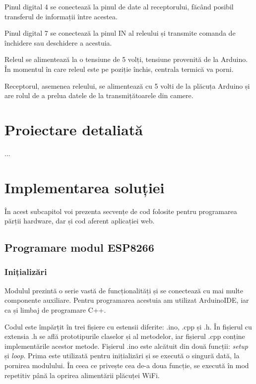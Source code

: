 	Pinul digital 4 se conectează la pinul de date al receptorului, făcând posibil transferul de informații între acestea.
	
	Pinul digital 7 se conectează la pinul IN al releului și transmite comanda de închidere sau deschidere a acestuia.

\vspace{1em}

	Releul se alimentează la o tensiune de 5 volți, tensiune provenită de la Arduino. În momentul în care releul este pe poziție închis, centrala termică va porni.

\vspace{1em}

	Receptorul, asemenea releului, se alimentează cu 5 volti de la plăcuța Arduino și are rolul de a prelua datele de la transmițătoarele din camere.

\section{Proiectare detaliată}

	...

\section{Implementarea soluției}

	În acest subcapitol voi prezenta secvențe de cod folosite pentru programarea părții hardware, dar și cod aferent aplicației web.

\subsection{Programare modul ESP8266}

\subsubsection{Inițializări}

	Modulul prezintă o serie vastă de funcționalități și se conectează cu mai multe componente auxiliare. Pentru programarea acestuia am utilizat ArduinoIDE, iar ca și limbaj de programare C++. 

	Codul este împărțit în trei fișiere cu estensii diferite: .ino, .cpp și .h. În fișierul cu extensia .h se află prototipurile claselor și al metodelor, iar fișierul .cpp conține implementările acestor metode. Fișierul .ino este alcătuit din două funcții: \textit{setup} și \textit{loop}. Prima este utilizată pentru inițializări și se execută o singură dată, la pornirea modulului. În ceea ce privește cea de-a doua funcție, se execută în mod repetitiv până la oprirea alimentării plăcuței WiFi.

